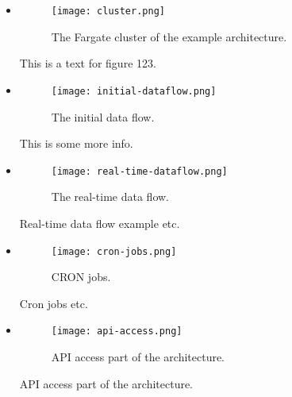 \begin{itemize}
\item \begin{figure}[!ht]
  \centering
  \texttt{[image: cluster.png]}
  \caption{The Fargate cluster of the example architecture.}
  \label{fig:cluster}
\end{figure}

This is a text for figure 123.

\item  \begin{figure}[!ht]
  \centering
  \texttt{[image: initial-dataflow.png]}
  \caption{The initial data flow.}
  \label{fig:initial-flow}
\end{figure}

This is some more info.

\item  \begin{figure}[!ht]
  \centering
  \texttt{[image: real-time-dataflow.png]}
  \caption{The real-time data flow.}
  \label{fig:realtime-flow}
\end{figure}

Real-time data flow example etc.

\item \begin{figure}[!ht]
  \centering
  \texttt{[image: cron-jobs.png]}
  \caption{CRON jobs.}
  \label{fig:cron}
\end{figure}

Cron jobs etc.

\item \begin{figure}[!ht]
  \centering
  \texttt{[image: api-access.png]}
  \caption{API access part of the architecture.}
  \label{fig:api-access}
\end{figure}

API access part of the architecture.

\end{itemize}




